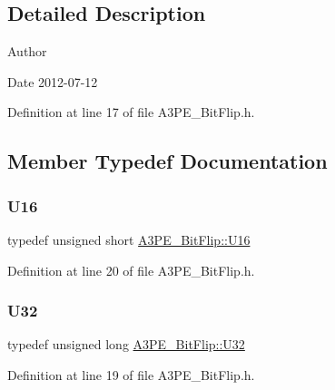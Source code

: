 \subsection{Detailed Description}
\begin{DoxyAuthor}{Author}

\end{DoxyAuthor}
\begin{DoxyDate}{Date}
2012-\/07-\/12 
\end{DoxyDate}


Definition at line 17 of file A3\+P\+E\+\_\+\+Bit\+Flip.\+h.



\subsection{Member Typedef Documentation}
\mbox{\label{classA3PE__BitFlip_a0fa3a1814a6661198e0ce5156d1cc474}} 
\subsubsection{\texorpdfstring{U16}{U16}}
{\footnotesize\ttfamily typedef unsigned short \hyperlink{classA3PE__BitFlip_a0fa3a1814a6661198e0ce5156d1cc474}{A3\+P\+E\+\_\+\+Bit\+Flip\+::\+U16}}



Definition at line 20 of file A3\+P\+E\+\_\+\+Bit\+Flip.\+h.

\mbox{\label{classA3PE__BitFlip_aaf047b5086a5ea11db565ce8283edfb4}} 
\subsubsection{\texorpdfstring{U32}{U32}}
{\footnotesize\ttfamily typedef unsigned long \hyperlink{classA3PE__BitFlip_aaf047b5086a5ea11db565ce8283edfb4}{A3\+P\+E\+\_\+\+Bit\+Flip\+::\+U32}}



Definition at line 19 of file A3\+P\+E\+\_\+\+Bit\+Flip.\+h.

\mbox{\label{classA3PE__BitFlip_ac561e6bbd8d4101ecc32016314a07581}} 
